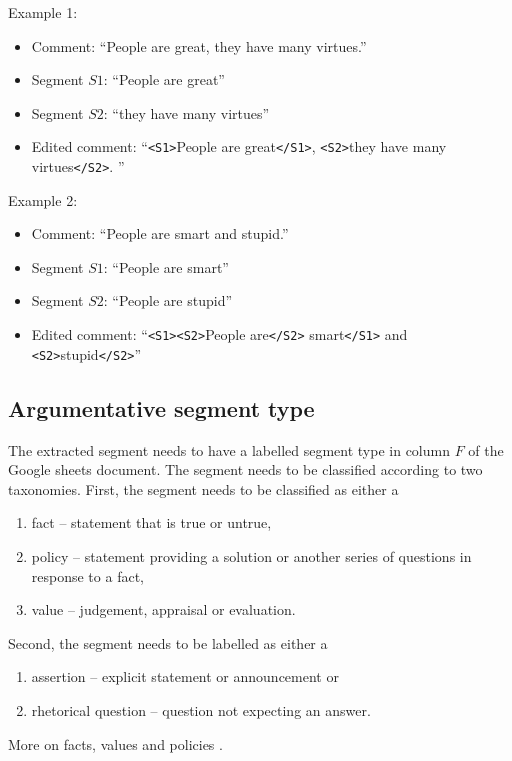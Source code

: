 \noindent Example 1: 

\begin{itemize}
  \item[] Comment: ``People are great, they have many virtues.''
  \item[] Segment $S1$: ``People are great''
  \item[] Segment $S2$: ``they have many virtues''
  \item[] Edited comment: ``\texttt{<S1>}People are great\texttt{</S1>},
  \texttt{<S2>}they have many virtues\texttt{</S2>}. ''
\end{itemize}

\noindent Example 2:
\begin{itemize}
\item[] Comment: ``People are smart and stupid.''
\item[] Segment $S1$: ``People are smart''
\item[] Segment $S2$: ``People are stupid''
\item[] Edited comment: ``\texttt{<S1><S2>}People are\texttt{</S2>} smart\texttt{</S1>}
and \texttt{<S2>}stupid\texttt{</S2>}''
\end{itemize}

\subsection{Argumentative segment type}

The extracted segment needs to have a labelled segment type in column $F$ of
the Google sheets document. The segment needs to be classified according to two
taxonomies. First, the segment needs to be classified as either a 
\begin{enumerate}
\item fact -- statement that is true or untrue,
\item policy -- statement providing a solution or another series of questions in response to a fact,
\item value -- judgement, appraisal or evaluation. 
\end{enumerate}
Second, the segment needs to be labelled as either a 
\begin{enumerate}
\item assertion -- explicit statement or announcement or
\item rhetorical question -- question not expecting an answer. 
\end{enumerate}
More on facts, values and policies \citep{factvaluepolicy}.

